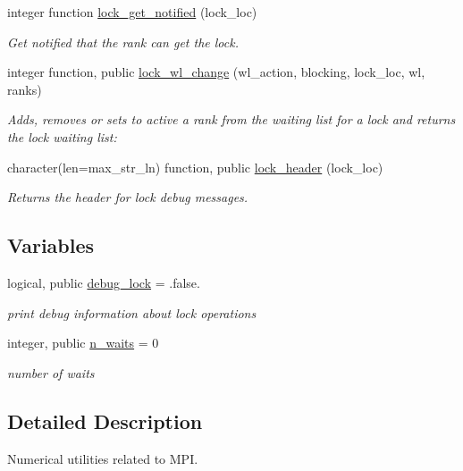 \begin{DoxyCompactItemize}
integer function \hyperlink{namespacempi__utilities_a17c39b0498528e2532c8347b0b7dec86}{lock\+\_\+get\+\_\+notified} (lock\+\_\+loc)
\begin{DoxyCompactList}\small\item\em Get notified that the rank can get the lock. \end{DoxyCompactList}\item 
integer function, public \hyperlink{namespacempi__utilities_a3b0349e5ec825e14083e3126c3e7ba65}{lock\+\_\+wl\+\_\+change} (wl\+\_\+action, blocking, lock\+\_\+loc, wl, ranks)
\begin{DoxyCompactList}\small\item\em Adds, removes or sets to active a rank from the waiting list for a lock and returns the lock waiting list\+: \end{DoxyCompactList}\item 
character(len=max\+\_\+str\+\_\+ln) function, public \hyperlink{namespacempi__utilities_abe5bf3ae3b6a06eda18c2f4d62ac09c5}{lock\+\_\+header} (lock\+\_\+loc)
\begin{DoxyCompactList}\small\item\em Returns the header for lock debug messages. \end{DoxyCompactList}\end{DoxyCompactItemize}
\subsection*{Variables}
\begin{DoxyCompactItemize}
\item 
logical, public \hyperlink{namespacempi__utilities_a98291c400747762ea4e3f0d751c5d5f5}{debug\+\_\+lock} = .false.
\begin{DoxyCompactList}\small\item\em print debug information about lock operations \end{DoxyCompactList}\item 
integer, public \hyperlink{namespacempi__utilities_a38a87fa6a7efbd985592bbef4750f02b}{n\+\_\+waits} = 0
\begin{DoxyCompactList}\small\item\em number of waits \end{DoxyCompactList}\end{DoxyCompactItemize}


\subsection{Detailed Description}
Numerical utilities related to M\+PI. 

